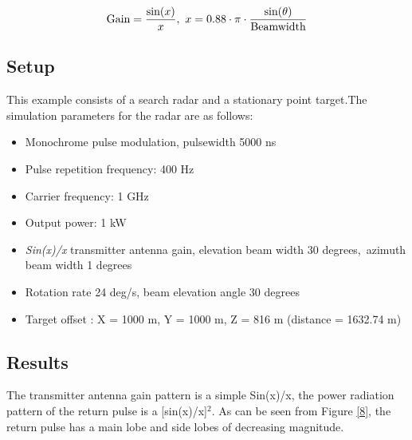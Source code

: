 \documentclass[thmsa,a4paper,ukenglish]{report}
\begin{document}
\[
\text{Gain}=\frac{\text{sin}(x)}{x},\text{ }x=0.88\cdot \pi \cdot \frac{%
\text{sin}(\theta )}{\text{Beamwidth}} 
\]

\subsection{Setup}

\smallskip This example consists of a search radar and a stationary point
target.\smallskip The simulation parameters for the radar are as follows:

\begin{itemize}
\item  Monochrome pulse modulation, pulsewidth 5000 ns

\item  \smallskip Pulse repetition frequency: 400 Hz

\item  \smallskip Carrier frequency: 1 GHz

\item  \smallskip Output power: 1 kW

\item  \smallskip \emph{Sin(x)/x} transmitter antenna gain, elevation beam
width 30 degrees,\ azimuth beam width 1 degrees

\item  \smallskip Rotation rate 24 deg/s, beam elevation angle 30 degrees

\item  Target offset : X = 1000 m, \smallskip Y = 1000 m, Z = 816 m
(distance = 1632.74 m)
\end{itemize}


\subsection{\protect\smallskip Results}

The transmitter antenna gain pattern is a simple Sin(x)/x, the power
radiation pattern of the return pulse is a [sin(x)/x]$^{2}$. As can be seen
from Figure \ref{8}, the return pulse has a main lobe and side lobes of
decreasing magnitude.
\end{document}
